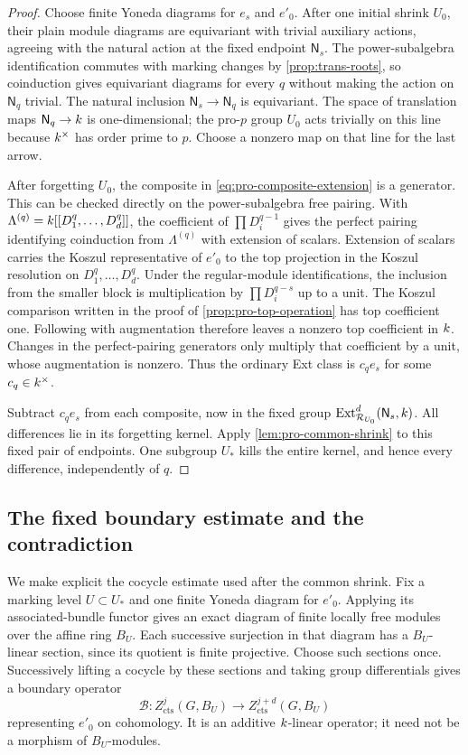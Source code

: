 \begin{proof}
Choose finite Yoneda diagrams for $e_s$ and $e'_0$.
After one initial shrink $U_0$, their plain module diagrams
are equivariant with trivial auxiliary actions, agreeing with
the natural action at the fixed endpoint $\mathsf N_s$.
The power-subalgebra identification commutes with marking
changes by \cref{prop:trans-roots}, so coinduction gives
equivariant diagrams for every $q$ without making the action
on $\mathsf N_q$ trivial.  The natural inclusion
$\mathsf N_s\to\mathsf N_q$ is equivariant.  The space of
translation maps $\mathsf N_q\to k$ is one-dimensional;
the pro-$p$ group $U_0$ acts trivially on this line because
$k^\times$ has order prime to $p$.  Choose a nonzero map
on that line for the last arrow.

After forgetting $U_0$, the composite in
\cref{eq:pro-composite-extension} is a generator.  This can
be checked directly on the power-subalgebra free pairing.
With
$\Lambda^{(q)}=k[[D_1^q,\ldots,D_d^q]]$, the coefficient
of $\prod D_i^{q-1}$ gives the perfect pairing identifying
coinduction from $\Lambda^{(q)}$ with extension of scalars.
Extension of scalars carries the Koszul representative of
$e'_0$ to the top projection in the Koszul resolution on
$D_1^q,\ldots,D_d^q$.  Under the regular-module
identifications, the inclusion from the smaller block is
multiplication by $\prod D_i^{q-s}$ up to a unit.  The
Koszul comparison written in the proof of
\cref{prop:pro-top-operation} has top coefficient one.
Following with augmentation therefore leaves a nonzero top
coefficient in $k$.  Changes in the perfect-pairing
generators only multiply that coefficient by a unit, whose
augmentation is nonzero.  Thus the ordinary Ext class is
$c_qe_s$ for some $c_q\in k^\times$.

Subtract $c_qe_s$ from each composite, now in the fixed group
$\operatorname{Ext}^d_{\mathcal R_{U_0}}(\mathsf N_s,k)$.
All differences lie in its forgetting kernel.  Apply
\cref{lem:pro-common-shrink} to this fixed pair of endpoints.
One subgroup $U_*$ kills the entire kernel, and hence every
difference, independently of $q$.
\end{proof}

\subsection{The fixed boundary estimate and the contradiction}

We make explicit the cocycle estimate used after the common shrink.
Fix a marking level $U\subset U_*$ and one finite Yoneda diagram
for $e'_0$.  Applying its associated-bundle functor gives an exact
diagram of finite locally free modules over the affine ring $B_U$.
Each successive surjection in that diagram has a $B_U$-linear
section, since its quotient is finite projective.  Choose such
sections once.  Successively lifting a cocycle by these sections
and taking group differentials gives a boundary operator
\[
 \mathcal B:
 Z^j_{\mathrm{cts}}(G,B_U)
       \longrightarrow Z^{j+d}_{\mathrm{cts}}(G,B_U)
\]
representing $e'_0$ on cohomology.  It is an additive
$k$-linear operator; it need not be a morphism of
$B_U$-modules.

